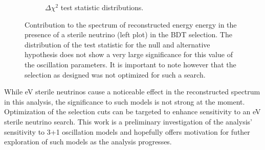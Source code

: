 \begin{figure}[H]
\begin{center}
\begin{subfigure}[b]{0.45\textwidth}
    \caption{$\Delta \chi^2$ test statistic distributions.}
    \end{subfigure}
\caption{Contribution to the spectrum of reconstructed energy energy in the presence of a sterile neutrino (left plot) in the \npsel BDT selection.
The distribution of the test statistic for the null and alternative hypothesis does not show a very large significance for this value of the oscillation parameters. It is important to note however that the selection as designed was not optimized for such a search.}
\label{fig:oscillation_sensitivity}
\end{center}
\end{figure}


While eV sterile neutrinos cause a noticeable effect in the reconstructed \nue spectrum in this analysis, the significance to such models is not strong at the moment. Optimization of the selection cuts can be targeted to enhance sensitivity to an eV sterile neutrino search. This work is a preliminary investigation of the analysis' sensitivity to 3+1 oscillation models and hopefully offers motivation for futher exploration of such models as the analysis progresses.

